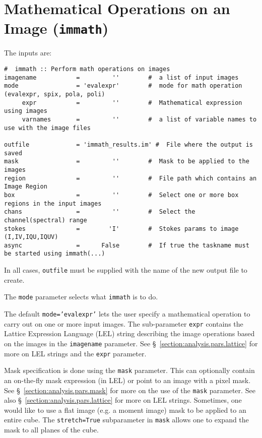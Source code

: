 \section{Mathematical Operations on an Image ({\tt immath})}
\label{section:analysis.immath}

The inputs are:
\small
\begin{verbatim}
#  immath :: Perform math operations on images
imagename           =         ''        #  a list of input images
mode                = 'evalexpr'        #  mode for math operation (evalexpr, spix, pola, poli)
     expr           =         ''        #  Mathematical expression using images
     varnames       =         ''        #  a list of variable names to use with the image files

outfile             = 'immath_results.im' #  File where the output is saved
mask                =         ''        #  Mask to be applied to the images
region              =         ''        #  File path which contains an Image Region
box                 =         ''        #  Select one or more box regions in the input images
chans               =         ''        #  Select the channel(spectral) range
stokes              =        'I'        #  Stokes params to image (I,IV,IQU,IQUV)
async               =      False        #  If true the taskname must be started using immath(...)
\end{verbatim}
\normalsize

In all cases, {\tt outfile} must be supplied with the name of the
new output file to create.

The {\tt mode} parameter selects what {\tt immath} is to do.

The default {\tt mode='evalexpr'} lets the user specify a mathematical
operation to carry out on one or more input images.
The sub-parameter {\tt expr} contains the Lattice Expression Language
(LEL) string describing the image operations based on the images
in the {\tt imagename} parameter.
See \S~\ref{section:analysis.pars.lattice} for more on LEL strings
and the {\tt expr} parameter.

Mask specification is done using the {\tt mask} parameter.  This can
optionally contain an on-the-fly mask expression (in LEL) or point to
an image with a pixel mask.  See \S~\ref{section:analysis.pars.mask}
for more on the use of the {\tt mask} parameter.  See also
\S~\ref{section:analysis.pars.lattice} for more on LEL
strings. Sometimes, one would like to use a flat image (e.g. a moment
image) mask to be applied to an entire cube. The {\tt stretch=True}
subparameter in {\tt mask} allows one to expand the mask to all planes
of the cube.

